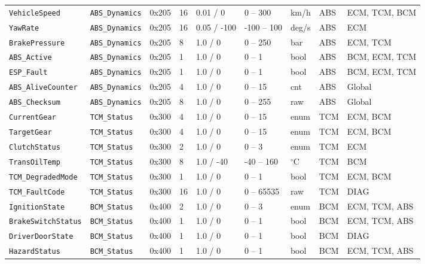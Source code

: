 \documentclass[11pt,a4paper]{article}
\begin{document}
\begin{table}[H]
\begin{tabular}{p{2.6cm} p{1.6cm} p{1.2cm} p{1.0cm} p{1.8cm} p{1.6cm} p{1.0cm} p{1.4cm} p{2.2cm}}
\texttt{VehicleSpeed} & \texttt{ABS\_Dynamics} & 0x205 & 16 & 0.01 / 0 & 0 -- 300 & km/h & ABS & ECM, TCM, BCM \\
\texttt{YawRate} & \texttt{ABS\_Dynamics} & 0x205 & 16 & 0.05 / -100 & -100 -- 100 & deg/s & ABS & ECM \\
\texttt{BrakePressure} & \texttt{ABS\_Dynamics} & 0x205 & 8 & 1.0 / 0 & 0 -- 250 & bar & ABS & ECM, TCM \\
\texttt{ABS\_Active} & \texttt{ABS\_Dynamics} & 0x205 & 1 & 1.0 / 0 & 0 -- 1 & bool & ABS & BCM, ECM, TCM \\
\texttt{ESP\_Fault} & \texttt{ABS\_Dynamics} & 0x205 & 1 & 1.0 / 0 & 0 -- 1 & bool & ABS & BCM, ECM, TCM \\
\texttt{ABS\_AliveCounter} & \texttt{ABS\_Dynamics} & 0x205 & 4 & 1.0 / 0 & 0 -- 15 & cnt & ABS & Global \\
\texttt{ABS\_Checksum} & \texttt{ABS\_Dynamics} & 0x205 & 8 & 1.0 / 0 & 0 -- 255 & raw & ABS & Global \\
\texttt{CurrentGear} & \texttt{TCM\_Status} & 0x300 & 4 & 1.0 / 0 & 0 -- 15 & enum & TCM & ECM, BCM \\
\texttt{TargetGear} & \texttt{TCM\_Status} & 0x300 & 4 & 1.0 / 0 & 0 -- 15 & enum & TCM & ECM, BCM \\
\texttt{ClutchStatus} & \texttt{TCM\_Status} & 0x300 & 2 & 1.0 / 0 & 0 -- 3 & enum & TCM & ECM \\
\texttt{TransOilTemp} & \texttt{TCM\_Status} & 0x300 & 8 & 1.0 / -40 & -40 -- 160 & $^\circ$C & TCM & BCM \\
\texttt{TCM\_DegradedMode} & \texttt{TCM\_Status} & 0x300 & 1 & 1.0 / 0 & 0 -- 1 & bool & TCM & ECM, BCM \\
\texttt{TCM\_FaultCode} & \texttt{TCM\_Status} & 0x300 & 16 & 1.0 / 0 & 0 -- 65535 & raw & TCM & DIAG \\
\texttt{IgnitionState} & \texttt{BCM\_Status} & 0x400 & 2 & 1.0 / 0 & 0 -- 3 & enum & BCM & ECM, TCM, ABS \\
\texttt{BrakeSwitchStatus} & \texttt{BCM\_Status} & 0x400 & 1 & 1.0 / 0 & 0 -- 1 & bool & BCM & ECM, TCM, ABS \\
\texttt{DriverDoorState} & \texttt{BCM\_Status} & 0x400 & 1 & 1.0 / 0 & 0 -- 1 & bool & BCM & DIAG \\
\texttt{HazardStatus} & \texttt{BCM\_Status} & 0x400 & 1 & 1.0 / 0 & 0 -- 1 & bool & BCM & ECM, TCM, ABS \\
\bottomrule
\end{tabular}
\end{table}
\end{document}
